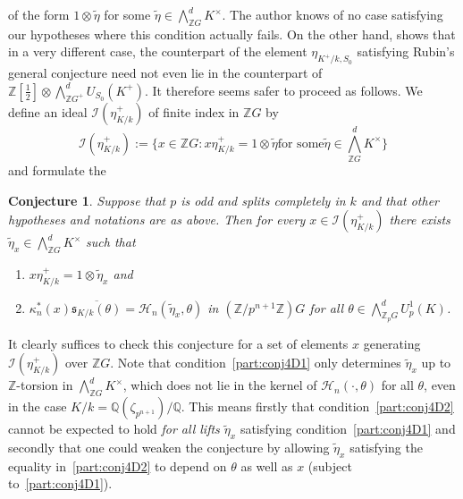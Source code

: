 \documentclass[12pt]{article}
\newtheorem{conj}{Conjecture}[section]
\newcounter{rem}[section]%
\newcommand{\bbQ}{\ensuremath{\mathbb{Q}}}
\newcommand{\bbZ}{\ensuremath{\mathbb{Z}}}
\newcommand{\cH}{\ensuremath{\mathcal{H}}}
\newcommand{\cI}{\ensuremath{\mathcal{I}}}
\newcommand{\fs}{\ensuremath{\mathfrak{s}}}
\newcommand{\half}{\frac{1}{2}}
\newcommand{\rem}{\refstepcounter{rem}\noindent{\sc Remark \therem}}%
\renewcommand{\therem}{\thesection.\arabic{rem}}
\newcommand{\pnpo}{\ensuremath{{p^{n+1}}}}
\newcommand{\sKk}{\ensuremath{\fs_{K/k}}}
\begin{document}
of the form $1\otimes\tilde{\eta}$ for some $\tilde{\eta}\in\bigwedge^d_{\bbZ G} K^\times$.
The author knows of no case satisfying our hypotheses where this condition
actually fails. On the other hand, \cite[Prop.~4.4]{Ru} shows that in a very different
case, the counterpart of the element $\eta_{K^+/k,S_0}$
satisfying Rubin's general conjecture need not even lie in the counterpart of
$\bbZ[\half]\otimes\bigwedge^d_{\bbZ G^+}U_{S_0}(K^+)$.  It therefore seems safer to
proceed as follows.
We define an ideal $\cI(\eta^+_{K/k})$ of finite index in $\bbZ G$ by
\[
\cI(\eta^+_{K/k}):=\{x\in \bbZ G :
\mbox{
$x\eta^+_{K/k}=
1\otimes\tilde{\eta}$
for some
$\tilde{\eta}\in\bigwedge^d_{\bbZ G} K^\times$
\}
}
\]
and formulate the
\begin{conj}\label{conj:4D} Suppose that $p$ is odd and splits completely in $k$
and that other hypotheses and notations are as above. Then for
every $x\in\cI(\eta^+_{K/k})$ there exists
$\tilde{\eta}_x\in\bigwedge^d_{\bbZ G}K^\times$ such that
\begin{enumerate}
\item\label{part:conj4D1}
$x\eta^+_{K/k}=1\otimes\tilde{\eta}_x$ and
\item\label{part:conj4D2}
$\kappa_n^\ast(x)\overline{\sKk(\theta)}=\cH_n(\tilde{\eta}_x,\theta)$
in $(\bbZ/\pnpo\bbZ)G$ for all
$\theta\in\bigwedge^d_{\bbZ_p G} U^1_p(K)$.
\end{enumerate}
\end{conj}
It clearly suffices to check this conjecture for a set of elements $x$ generating
$\cI(\eta^+_{K/k})$ over $\bbZ G$.
Note that condition~\ref{part:conj4D1} only
determines $\tilde{\eta}_x$ up to
$\bbZ$-torsion in $\bigwedge^d_{\bbZ G}K^\times$, which
does not lie in the kernel of $\cH_n(\cdot,\theta)$ for all $\theta$, even in
the case $K/k=\bbQ(\zeta_\pnpo)/\bbQ$. This means
firstly that condition~\ref{part:conj4D2} cannot be expected to
hold \emph{for all lifts $\tilde{\eta}_x$} satisfying
condition~\ref{part:conj4D1} and secondly that one could
weaken the conjecture by allowing $\tilde{\eta}_x$ satisfying the equality
in~\ref{part:conj4D2} to depend on $\theta$ as well as $x$
(subject to~\ref{part:conj4D1}).
\end{document}
